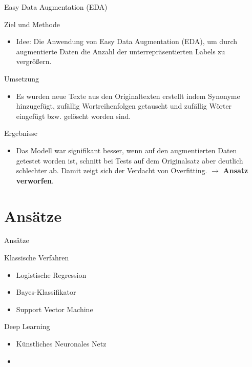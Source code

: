 \documentclass[aspectratio=169]{beamer} %
\begin{document}
\begin{frame}{Easy Data Augmentation (EDA)}
    \begin{block}{Ziel und Methode}
        \begin{itemize}
            \item Idee: Die Anwendung von Easy Data Augmentation (EDA), um durch augmentierte Daten die Anzahl der unterrepräsentierten Labels zu vergrößern.
        \end{itemize}
    \end{block}

    \begin{block}{Umsetzung}
        \begin{itemize}
            \item Es wurden neue Texte aus den Originaltexten erstellt indem Synonyme hinzugefügt, zufällig Wortreihenfolgen getauscht und zufällig Wörter eingefügt bzw. gelöscht worden sind.
        \end{itemize}
    \end{block}

    \begin{block}{Ergebnisse}
        \begin{itemize}
            \item Das Modell war signifikant besser, wenn auf den augmentierten Daten getestet worden ist, schnitt bei Tests auf dem Originalsatz aber deutlich schlechter ab. Damit zeigt sich der Verdacht von Overfitting. $\to$ \textbf{Ansatz verworfen}.
        \end{itemize}
    \end{block}
\end{frame}

\section{Ansätze}

\begin{frame}{Ansätze}
    \begin{block}{Klassische Verfahren}
        \begin{itemize}
            \item Logistische Regression
            \item Bayes-Klassifikator
            \item Support Vector Machine
        \end{itemize}
    \end{block}
    \begin{block}{Deep Learning}
        \begin{itemize}
            \item Künstliches Neuronales Netz
            \item {}
        \end{itemize}
    \end{block}
\end{frame}
\end{document}
